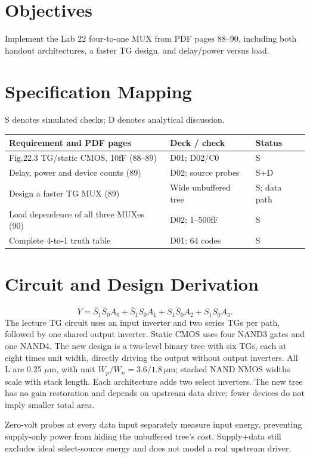 \section{Objectives}
Implement the Lab 22 four-to-one MUX from PDF pages 88--90, including both handout architectures, a faster TG design, and delay/power versus load.

\section{Specification Mapping}
S denotes simulated checks; D denotes analytical discussion.

\small\begin{longtable}{p{.46\linewidth}p{.30\linewidth}p{.15\linewidth}}\toprule
Requirement and PDF pages & Deck / check & Status \\ \midrule\endhead
Fig.22.3 TG/static CMOS, 10fF (88--89) & D01; D02/C0 & S \\
Delay, power and device counts (89) & D02; source probes & S+D \\
Design a faster TG MUX (89) & Wide unbuffered tree & S; data path \\
Load dependence of all three MUXes (90) & D02; 1--500fF & S \\
Complete 4-to-1 truth table & D01; 64 codes & S \\
\bottomrule\end{longtable}\normalsize


\section{Circuit and Design Derivation}
\[Y=\overline S_1\overline S_0A_0+\overline S_1S_0A_1+S_1\overline S_0A_2+S_1S_0A_3.\]
The lecture TG circuit uses an input inverter and two series TGs per path, followed by one shared output inverter. Static CMOS uses four NAND3 gates and one NAND4. The new design is a two-level binary tree with six TGs, each at eight times unit width, directly driving the output without output inverters. All L are 0.25 $\mu$m, with unit $W_p/W_n=3.6/1.8\,\mu$m; stacked NAND NMOS widths scale with stack length. Each architecture adds two select inverters. The new tree has no gain restoration and depends on upstream data drive; fewer devices do not imply smaller total area.

Zero-volt probes at every data input separately measure input energy, preventing supply-only power from hiding the unbuffered tree's cost. Supply+data still excludes ideal select-source energy and does not model a real upstream driver.


